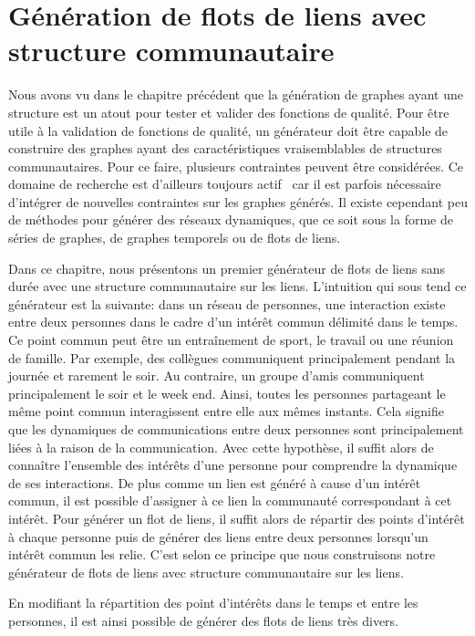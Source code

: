 \chapter{Génération de flots de liens avec structure communautaire}
\minitoc
\label{versQualite}

Nous avons vu dans le chapitre précédent que la génération de graphes ayant une structure est un atout pour tester et valider des fonctions de qualité.
Pour être utile à la validation de fonctions de qualité, un générateur doit être capable de construire des graphes ayant des caractéristiques vraisemblables de structures communautaires.
Pour ce faire, plusieurs contraintes peuvent être considérées.
Ce domaine de recherche est d'ailleurs toujours actif~\cite{Tabourier2011,Obradovic2014} car il est parfois nécessaire d'intégrer de nouvelles contraintes sur les graphes générés.
Il existe cependant peu de méthodes pour générer des réseaux dynamiques, que ce soit sous la forme de séries de graphes, de graphes temporels ou de flots de liens.


Dans ce chapitre, nous présentons un premier générateur de flots de liens sans durée avec une structure communautaire sur les liens.
L'intuition qui sous tend ce générateur est la suivante:
dans un réseau de personnes, une interaction existe entre deux personnes dans le cadre d'un intérêt commun délimité dans le temps.
Ce point commun peut être un entraînement de sport, le travail ou une réunion de famille.
Par exemple, des collègues communiquent principalement pendant la journée et rarement le soir.
Au contraire, un groupe d'amis communiquent principalement le soir et le week end.
Ainsi, toutes les personnes partageant le même point commun interagissent entre elle aux mêmes instants.
Cela signifie que les dynamiques de communications entre deux personnes sont principalement liées à la raison de la communication.
Avec cette hypothèse, il suffit alors de connaître l'ensemble des intérêts d'une personne pour comprendre la dynamique de ses interactions.
De plus comme un lien est généré à cause d'un intérêt commun, il est possible d'assigner à ce lien la communauté correspondant à cet intérêt.
Pour générer un flot de liens, il suffit alors de répartir des points d'intérêt à chaque personne puis de générer des liens entre deux personnes lorsqu'un intérêt commun les relie.
C'est selon ce principe que nous construisons notre générateur de flots de liens avec structure communautaire sur les liens.

En modifiant la répartition des point d'intérêts dans le temps et entre les personnes, il est ainsi possible de générer des flots de liens très divers.

